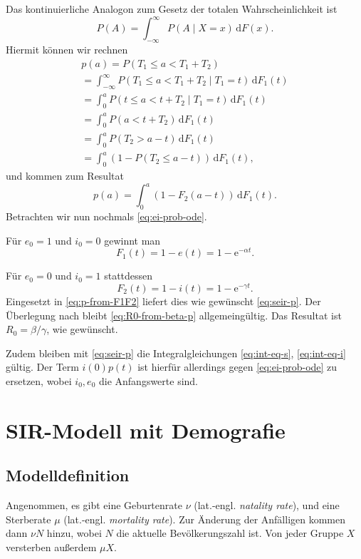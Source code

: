 \documentclass[a4paper,10pt,fleqn,twocolumn,twoside,dvipdfmx]{scrartcl}
\numberwithin{equation}{section}
\newcommand{\ee}{\mathrm e}
\begin{document}
Das kontinuierliche Analogon zum Gesetz der totalen
Wahrscheinlichkeit ist
\begin{equation}
P(A) = \int_{-\infty}^\infty P(A\mid X=x)\,\mathrm dF(x).
\end{equation}
Hiermit können wir rechnen
\begin{gather*}
p(a) = P(T_1\le a < T_1+T_2)\\
= \int_{-\infty}^\infty P(T_1\le a < T_1+T_2\mid T_1=t)\,\mathrm dF_1(t)\\
= \int_0^a P(t\le a < t+T_2 \mid T_1=t)\,\mathrm dF_1(t)\\
= \int_0^a P(a < t+T_2)\,\mathrm dF_1(t)\\
= \int_0^a P(T_2 > a-t)\,\mathrm dF_1(t)\\
= \int_0^a (1-P(T_2\le a-t))\,\mathrm dF_1(t),
\end{gather*}
und kommen zum Resultat
\begin{equation}\label{eq:p-from-F1F2}
p(a) = \int_0^a (1-F_2(a-t))\,\mathrm dF_1(t).
\end{equation}
Betrachten wir nun nochmals \eqref{eq:ei-prob-ode}.

Für $e_0=1$ und $i_0=0$ gewinnt man
\begin{equation}
F_1(t) = 1-e(t) = 1-\ee^{-\alpha t}.
\end{equation}

Für $e_0=0$ und $i_0=1$ stattdessen
\begin{equation}
F_2(t) = 1-i(t) = 1-\ee^{-\gamma t}.
\end{equation}
Eingesetzt in \eqref{eq:p-from-F1F2} liefert dies
wie gewünscht \eqref{eq:seir-p}. Der Überlegung nach bleibt
\eqref{eq:R0-from-beta-p} allgemeingültig. Das Resultat
ist $R_0=\beta/\gamma$, wie gewünscht.

Zudem bleiben mit \eqref{eq:seir-p} die Integralgleichungen
\eqref{eq:int-eq-s}, \eqref{eq:int-eq-i} gültig. Der Term $i(0)p(t)$
ist hierfür allerdings gegen \eqref{eq:ei-prob-ode} zu ersetzen,
wobei $i_0,e_0$ die Anfangswerte sind.


\section{SIR-Modell mit Demografie}
\subsection{Modelldefinition}
Angenommen, es gibt eine Geburtenrate $\nu$ (lat.-engl. \emph{natality rate}), 
und eine Sterberate $\mu$ (lat.-engl. \emph{mortality rate}). Zur Änderung der
Anfälligen kommen dann $\nu N$ hinzu, wobei $N$ die aktuelle
Bevölkerungszahl ist. Von jeder Gruppe $X$ versterben außerdem $\mu X$.
\end{document}

